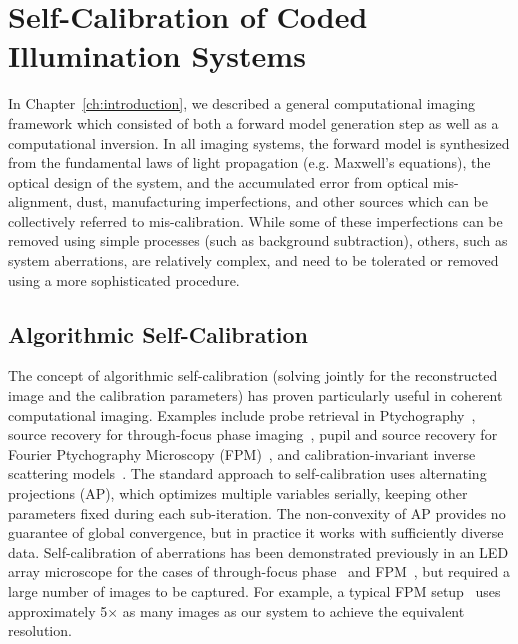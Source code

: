 
\chapter{Self-Calibration of Coded Illumination Systems}\label{ch:selfcal}

In Chapter~\ref{ch:introduction}, we described a general computational imaging framework which consisted of both a forward model generation step as well as a computational inversion. In all imaging systems, the forward model is synthesized from the fundamental laws of light propagation (e.g. Maxwell's equations), the optical design of the system, and the accumulated error from optical mis-alignment, dust, manufacturing imperfections, and other sources which can be collectively referred to mis-calibration. While some of these imperfections can be removed using simple processes (such as background subtraction), others, such as system aberrations, are relatively complex, and need to be tolerated or removed using a more sophisticated procedure.

\section{Algorithmic Self-Calibration}
The concept of algorithmic self-calibration (solving jointly for the reconstructed image and the calibration parameters) has proven particularly useful in coherent computational imaging. Examples include probe retrieval in Ptychography~\cite{guizar2008phase, maiden2009improved, tripathi2014ptychographic, Maiden2012}, source recovery for through-focus phase imaging~\cite{jingshan2015partially, zhong2016nonlinear}, pupil and source recovery for Fourier Ptychography Microscopy (FPM)~\cite{Bian:13,Yeh2015,Bian:16}, and calibration-invariant inverse scattering models~\cite{satat2017object}. The standard approach to self-calibration uses alternating projections (AP), which optimizes multiple variables serially, keeping other parameters fixed during each sub-iteration. The non-convexity of AP provides no guarantee of global convergence, but in practice it works with sufficiently diverse data. Self-calibration of aberrations has been demonstrated previously in an LED array microscope for the cases of through-focus phase~\cite{zheng2013characterization} and FPM~\cite{Bian:13,Horstmeyer:14,Ou:14,tian2015computational,Chung:16fluor}, but required a large number of images to be captured. For example, a typical FPM setup~\cite{ou2015high} uses approximately 5$\times$ as many images as our system to achieve the equivalent resolution.

